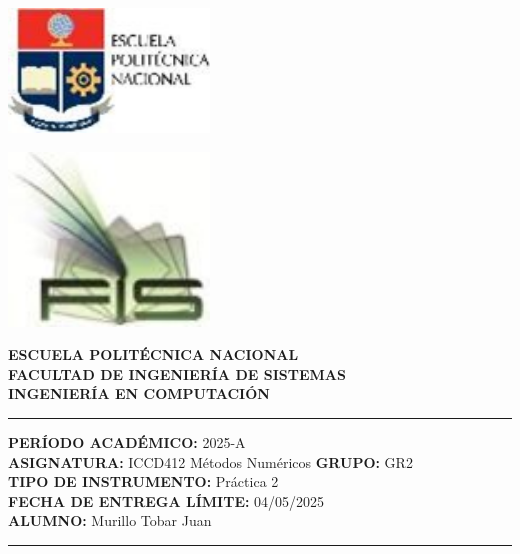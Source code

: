 \documentclass[12pt]{article}
\begin{document}
\begin{minipage}{0.45\textwidth}
    \includegraphics[width=0.4\textwidth]{inFiles/Figures/epnLogo.jpg}
\end{minipage}
\hfill
\begin{minipage}{0.45\textwidth}
    \raggedleft
    \includegraphics[width=0.4\textwidth]{inFiles/Figures/FIS_logo.jpg}
\end{minipage}

\vspace{0.5cm}

\begin{center}
    \textbf{ESCUELA POLITÉCNICA NACIONAL}\\[0.2cm]
    \textbf{FACULTAD DE INGENIERÍA DE SISTEMAS}\\[0.2cm]
    \textbf{INGENIERÍA {\textbf{EN COMPUTACIÓN}}}
\end{center}

\vspace{0.5cm}
\hrule
\vspace{0.5cm}

\noindent\textbf{PERÍODO ACADÉMICO:} 2025-A\\[0.2cm]
\noindent\textbf{ASIGNATURA:} ICCD412 Métodos Numéricos \hfill \textbf{GRUPO:} GR2\\[0.2cm]
\noindent\textbf{TIPO DE INSTRUMENTO:} Práctica 2\\[0.2cm]
\noindent\textbf{FECHA DE ENTREGA LÍMITE:} 04/05/2025\\[0.2cm]
\noindent\textbf{ALUMNO:} Murillo Tobar Juan

\vspace{0.5cm}
\hrule
\vspace{1cm}
\end{document}
